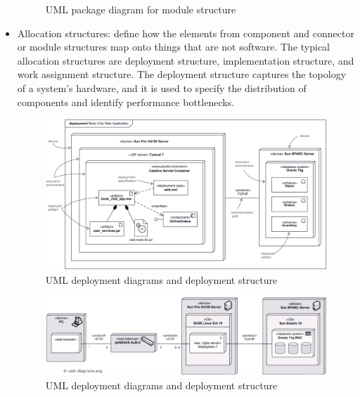 \documentclass[12pt, a4paper]{report}
\begin{document}
\begin{itemize}
\begin{figure}[H]
                        \caption{UML package diagram for module structure}
                    \end{figure}
                \item Allocation structures: define how the elements from component and connector or module structures map onto things that are not software. The typical 
                    allocation structures are deployment structure, implementation structure, and work assignment structure. The deployment structure captures the topology 
                    of a system's hardware, and it is used to specify the distribution of components and identify performance bottlenecks.
                    \begin{figure}[H]
                        \centering
                        \includegraphics[width=0.5\linewidth]{images/allocation1.png}
                        \caption{UML deployment diagrams and deployment structure}
                    \end{figure}
                    \begin{figure}[H]
                        \centering
                        \includegraphics[width=0.5\linewidth]{images/allocation2.png}
                        \caption{UML deployment diagrams and deployment structure}
                    \end{figure}
            \end{itemize}
\end{document}
